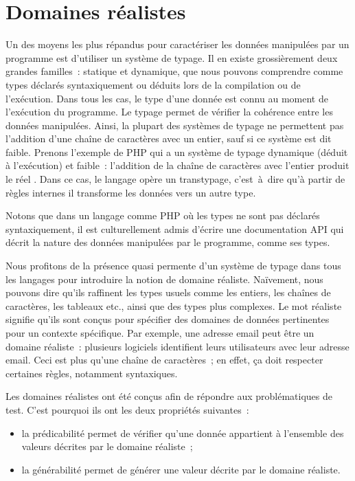 \section{Domaines réalistes}
\label{section:language:realdoms}

Un des moyens les plus répandus pour caractériser les données manipulées par un
programme est d'utiliser un système de {\strong typage}. Il en existe
grossièrement deux grandes familles~: {\strong statique} et {\strong dynamique},
que nous pouvons comprendre comme types déclarés syntaxiquement ou déduits lors
de la compilation ou de l'exécution. Dans tous les cas, le type d'une donnée est
connu au moment de l'{\strong exécution} du programme. Le typage permet de
{\strong vérifier} la cohérence entre les données manipulées. Ainsi, la plupart
des systèmes de typage ne permettent pas l'addition d'une chaîne de caractères
avec un entier, sauf si ce système est dit {\strong faible}. Prenons l'exemple
de PHP qui a un système de typage dynamique (déduit à l'exécution) et faible~:
l'addition de la chaîne de caractères  avec l'entier 
produit le réel . Dans ce cas, le langage opère un transtypage,
c'est~à~dire qu'à partir de règles internes il transforme les données vers un
autre type.

Notons que dans un langage comme PHP où les types ne sont pas déclarés
syntaxiquement, il est culturellement admis d'écrire une documentation API qui
décrit la nature des données manipulées par le programme, comme ses types.

Nous profitons de la présence quasi permente d'un système de typage dans tous
les langages pour introduire la notion de {\strong domaine réaliste}. Naïvement,
nous pouvons dire qu'ils raffinent les types usuels comme les entiers, les
chaînes de caractères, les tableaux etc., ainsi que des types plus complexes. Le
mot {\strong réaliste} signifie qu'ils sont conçus pour spécifier des domaines
de données pertinentes pour un contexte spécifique. Par exemple, une adresse
email peut être un domaine réaliste~: plusieurs logiciels identifient leurs
utilisateurs avec leur adresse email. Ceci est plus qu'une chaîne de
caractères~; en effet, ça doit respecter certaines règles, notamment
syntaxiques.

Les domaines réalistes ont été conçus afin de répondre aux problématiques de
test. C'est pourquoi ils ont les deux propriétés suivantes~:

\begin{itemize}

\item la {\strong prédicabilité} permet de vérifier qu'une donnée appartient à
l'ensemble des valeurs décrites par le domaine réaliste~;

\item la {\strong générabilité} permet de générer une valeur décrite par le
domaine réaliste.

\end{itemize}

